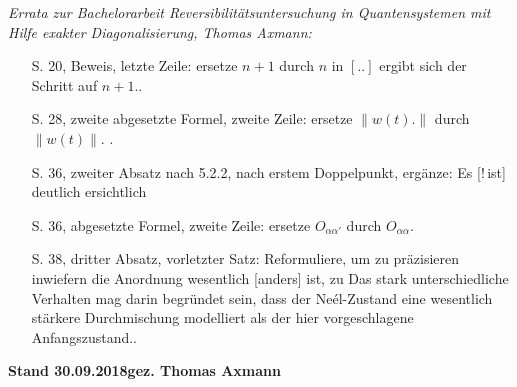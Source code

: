 \documentclass[10pt,oneside]{scrartcl}
\newcommand{\timo}{$[..]$}
\newcommand{\etico}[1]{\glqq{}#1{}\grqq{}}
\begin{document}
\textsl{Errata zur Bachelorarbeit \glqq Reversibilitätsuntersuchung in Quantensystemen mit Hilfe exakter
Diagonalisierung\grqq, Thomas Axmann:}
\begin{itemize}\itemsep0pt
\item[S. 20,] Beweis, letzte Zeile: ersetze $n\!+\!1$ durch $n$ in \etico{\timo{} ergibt sich der Schritt auf
  $n+1$.}.
\item[S. 28,] zweite abgesetzte Formel, zweite Zeile: ersetze \etico{$\|w(t).\|$} durch \etico{$\|w(t)\|.$} .
\item[S. 36,] zweiter Absatz nach 5.2.2, nach erstem Doppelpunkt, ergänze: \etico{Es [!\,ist] deutlich ersichtlich} 
\item[S. 36,] abgesetzte Formel, zweite Zeile: ersetze \etico{$O_{\alpha\alpha'}$} durch
  \etico{$O_{\alpha\alpha}$}.
\item[S. 38,] dritter Absatz, vorletzter Satz: Reformuliere, um zu präzisieren inwiefern die Anordnung
  \glqq{}wesentlich [anders]\grqq{} ist, zu \glqq{}Das stark unterschiedliche Verhalten mag darin begründet
    sein, dass der Ne\'el-Zustand eine wesentlich stärkere Durchmischung modelliert als der hier
    vorgeschlagene Anfangszustand.\grqq{}.  
\end{itemize}
\vfill
\textbf{\large\sffamily Stand 30.09.2018\hfill gez. Thomas Axmann}
\end{document}
